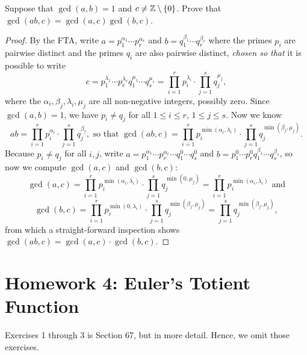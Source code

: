 \documentclass{article}
\begin{document}
\begin{exercise}
Suppose that $\gcd(a,b)=1$ and $c\neq \mathbb Z\setminus\{0\}$. Prove that $\gcd(ab,c) = \gcd(a,c) \gcd(b,c)$.
\end{exercise}
\begin{proof}
By the FTA, write $a = p_1^{\alpha_1}\cdots p_r^{\alpha_r}$ and $b = q_1^{\beta_1}\cdots q_r^{\beta_r}$ where the primes $p_i$ are pairwise distinct and the primes $q_i$ are also pairwise distinct, \textit{chosen so that} it is possible to write $$c = p_1^{\lambda_1}\cdots p_r^{\lambda_r}q_1^{\mu_1}\cdots q_s^{\mu_s} = \prod_{i=1}^r p_i^{\lambda_i} \cdot \prod_{j=1}^s q_j^{\mu_j},$$ where the $\alpha_i, \beta_j, \lambda_i, \mu_j$ are all non-negative integers, possibly zero. Since $\gcd(a, b) = 1$, we have $p_i \neq q_j$ for all $1 \leq i \leq r$, $1\leq j \leq s$. Now we know
$$ab = \prod_{i=1}^r p_i^{\alpha_i} \cdot \prod_{j=1}^s q_j^{\beta_j}, \text{ so that }\gcd(ab, c)= \prod_{i=1}^r p_i^{\min(\alpha_i, \lambda_i)} \cdot \prod_{j=1}^s q_j^{\min(\beta_j, \mu_j)}.$$
Because $p_i\neq q_j$ for all $i, j$, write $a = p_1^{\alpha_1}\cdots p_r^{\alpha_r}\cdots q_1^0\cdots q_s^0$ and $b = p_1^0\cdots p_r^0q_1^{\beta_1}\cdots q_s^{\beta_s}$, so now we compute $\gcd(a,c)$ and $\gcd(b,c)$:
$$\gcd(a,c) = \prod_{i=1}^r p_i^{\min(\alpha_i, \lambda_i)} \cdot \prod_{j=1}^s q_j^{\min(0, \mu_j)} = \prod_{i=1}^r p_i^{\min(\alpha_i, \lambda_i)} \text{ and}$$
$$\gcd(b,c) = \prod_{i=1}^r p_i^{\min(0, \lambda_i)} \cdot \prod_{j=1}^s q_j^{\min(\beta_j, \mu_j)} = \prod_{j=1}^s q_j^{\min(\beta_j, \mu_j)},$$
from which a straight-forward inspection shows $\gcd(ab, c) = \gcd(a, c) \cdot \gcd(b, c)$.
\end{proof}

\section*{Homework 4: Euler's Totient Function}
Exercises 1 through 3 is Section 67, but in more detail. Hence, we omit those exercises.
\end{document}
